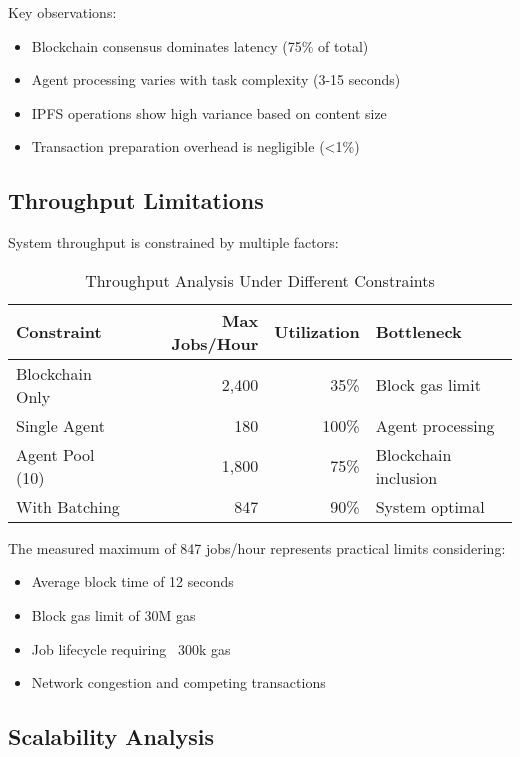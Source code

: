 Key observations:
\begin{itemize}
    \item Blockchain consensus dominates latency (75\% of total)
    \item Agent processing varies with task complexity (3-15 seconds)
    \item IPFS operations show high variance based on content size
    \item Transaction preparation overhead is negligible (<1\%)
\end{itemize}

\subsection{Throughput Limitations}

System throughput is constrained by multiple factors:

\begin{table}[h]
\centering
\caption{Throughput Analysis Under Different Constraints}
\label{tab:throughput}
\begin{tabular}{lrrl}
\toprule
\textbf{Constraint} & \textbf{Max Jobs/Hour} & \textbf{Utilization} & \textbf{Bottleneck} \\
\midrule
Blockchain Only & 2,400 & 35\% & Block gas limit \\
Single Agent & 180 & 100\% & Agent processing \\
Agent Pool (10) & 1,800 & 75\% & Blockchain inclusion \\
With Batching & 847 & 90\% & System optimal \\
\bottomrule
\end{tabular}
\end{table}

The measured maximum of 847 jobs/hour represents practical limits considering:
\begin{itemize}
    \item Average block time of 12 seconds
    \item Block gas limit of 30M gas
    \item Job lifecycle requiring ~300k gas
    \item Network congestion and competing transactions
\end{itemize}

\subsection{Scalability Analysis}

